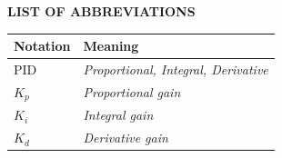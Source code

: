 \clearpage
{}
{}

\begin{center}
    \large \textbf{LIST OF ABBREVIATIONS}
\end{center}
\vspace{3em}

\begin{center}
    \begin{tabularx}{0.8\textwidth} {
            >{\raggedright\arraybackslash}X
            >{\raggedright\arraybackslash}X}
        \hline
        \textbf{Notation} & \textbf{Meaning}                    \\
        \hline
        PID     & \textit{\textit{Proportional, Integral, Derivative}}\\
        $K_{p}$ & \textit{Proportional gain}\\
        $K_{i}$ & \textit{Integral gain}\\
        $K_{d}$ & \textit{Derivative gain}\\
        \hline
    \end{tabularx}
\end{center}
